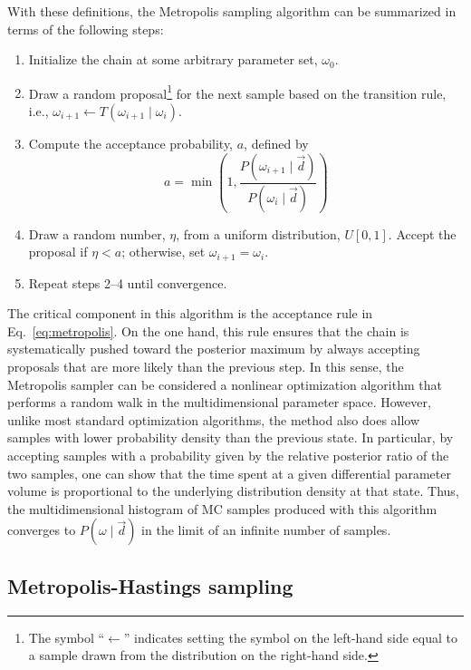\documentclass[twocolumn]{aa}
\renewcommand{\d}[0]{\vec{d}}
\begin{document}
With these definitions, the Metropolis sampling algorithm can be
summarized in terms of the following steps:
\begin{enumerate}
  \item Initialize the chain at some arbitrary parameter set,
    $\omega_0$.
  \item Draw a random proposal\footnote{The symbol ``$\leftarrow$''
    indicates setting the symbol on the left-hand side equal to a
    sample drawn from the distribution on the right-hand side.} for the next
    sample based on the transition rule, i.e., $\omega_{i+1}
    \leftarrow T(\omega_{i+1}\mid \omega_i)$.
  \item Compute the acceptance probability, $a$, defined by
    \begin{equation}
      a = \min\left(1,
      \frac{P(\omega_{i+1}\mid \d)}{P(\omega_i\mid \d)}\right)
      \label{eq:metropolis}
    \end{equation}
  \item Draw a random number, $\eta$, from a uniform distribution,
    $U[0,1]$. Accept the proposal if $\eta < a$; otherwise, set
        ${\omega_{i+1} = \omega_i}$.
  \item Repeat steps 2--4 until convergence.
\end{enumerate}

The critical component in this algorithm is the acceptance rule in
Eq.~\eqref{eq:metropolis}. On the one hand, this rule ensures that the
chain is systematically pushed toward the posterior maximum by always
accepting proposals that are more likely than the previous step. In
this sense, the Metropolis sampler can be considered a nonlinear
optimization algorithm that performs a random walk in the
multidimensional parameter space. However, unlike most standard
optimization algorithms, the method also does allow samples with lower
probability density than the previous state. In particular, by
accepting samples with a probability given by the relative posterior
ratio of the two samples, one can show that the time spent at a
given differential parameter volume is proportional to the underlying distribution
density at that state. Thus, the multidimensional histogram of MC
samples produced with this algorithm converges to $P(\omega\mid \d)$ in
the limit of an infinite number of samples.

\subsection{Metropolis-Hastings sampling}
\end{document}
